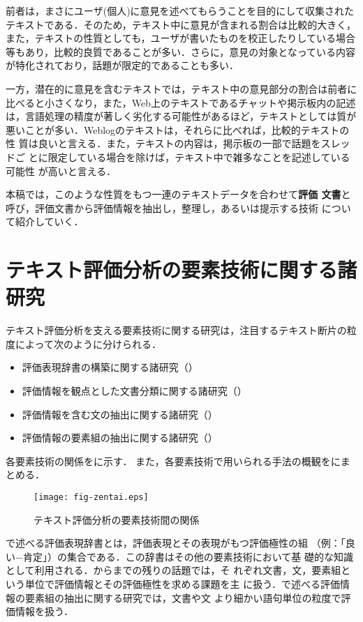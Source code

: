前者は，まさにユーザ(個人)に意見を述べてもらうことを目的にして収集された
テキストである．そのため，テキスト中に意見が含まれる割合は比較的大きく，
また，テキストの性質としても，ユーザが書いたものを校正したりしている場合
等もあり，比較的良質であることが多い．さらに，意見の対象となっている内容
が特化されており，話題が限定的であることも多い．

一方，潜在的に意見を含むテキストでは，テキスト中の意見部分の割合は前者に
比べると小さくなり，また，Web上のテキストであるチャットや掲示板内の記述
は，言語処理の精度が著しく劣化する可能性があるほど，テキストとしては質が
悪いことが多い．Weblogのテキストは，それらに比べれば，比較的テキストの性
質は良いと言える．また，テキストの内容は，掲示板の一部で話題をスレッドご
とに限定している場合を除けば，テキスト中で雑多なことを記述している可能性
が高いと言える．

本稿では，このような性質をもつ一連のテキストデータを合わせて\textbf{評価
文書}と呼び，評価文書から評価情報を抽出し，整理し，あるいは提示する技術
について紹介していく．

\section{テキスト評価分析の要素技術に関する諸研究}
\label{sec:aa}

テキスト評価分析を支える要素技術に関する研究は，注目するテキスト断片の粒
度によって次のように分けられる．

\begin{itemize}
 \item 評価表現辞書の構築に関する諸研究（）
 \item 評価情報を観点とした文書分類に関する諸研究（）
 \item 評価情報を含む文の抽出に関する諸研究（）
 \item 評価情報の要素組の抽出に関する諸研究（）
\end{itemize}

各要素技術の関係をに示す．
また，各要素技術で用いられる手法の概観をにまとめる．

\begin{figure}[b]
  \begin{center} 
        \texttt{[image: fig-zentai.eps]}
    \caption{テキスト評価分析の要素技術間の関係}
    \label{fig:zentai}
  \end{center}
\end{figure}

で述べる評価表現辞書とは，評価表現とその表現がもつ評価極性の組
（例：「良い−肯定」）の集合である．この辞書はその他の要素技術において基
礎的な知識として利用される．からまでの残りの話題では，そ
れぞれ文書，文，要素組という単位で評価情報とその評価極性を求める課題を主
に扱う．で述べる評価情報の要素組の抽出に関する研究では，文書や文
より細かい語句単位の粒度で評価情報を扱う．

